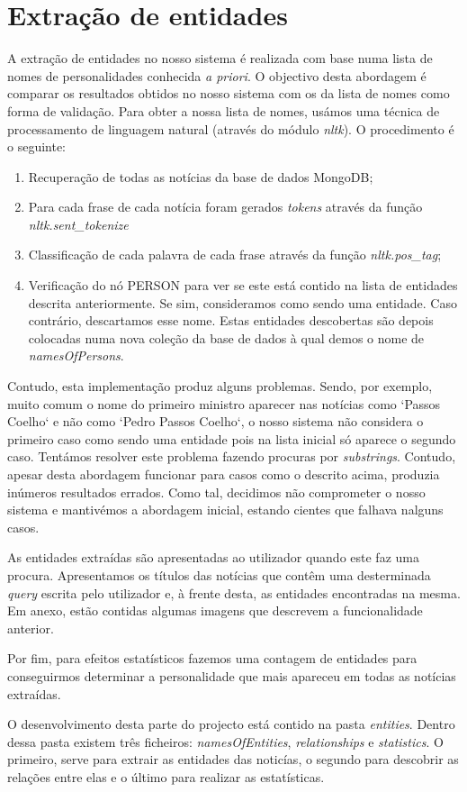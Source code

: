 \section{Extração de entidades}
A extração de entidades no nosso sistema é realizada com base numa lista de nomes de personalidades conhecida \textit{a priori}. O objectivo desta abordagem é comparar os resultados obtidos no nosso sistema com os da lista de nomes como forma de validação. Para obter a nossa lista de nomes, usámos uma técnica de processamento de linguagem natural (através do módulo \textit{nltk}). O procedimento é o seguinte:


\begin{enumerate}
  \item Recuperação de todas as notícias da base de dados MongoDB;
  \item Para cada frase de cada notícia foram gerados \textit{tokens} através da função \textit{nltk.sent\_tokenize}
  \item Classificação de cada palavra de cada frase através da função \textit{nltk.pos\_tag};
  \item Verificação do nó PERSON para ver se este está contido na lista de entidades descrita anteriormente. Se sim, consideramos como sendo uma entidade. Caso contrário, descartamos esse nome. Estas entidades descobertas são depois colocadas numa nova coleção da base de dados à qual demos o nome de \textit{namesOfPersons}. 
\end{enumerate}

Contudo, esta implementação produz alguns problemas. Sendo, por exemplo, muito comum o nome do primeiro ministro aparecer nas notícias como `Passos Coelho` e não como `Pedro Passos Coelho`, o nosso sistema não considera o primeiro caso como sendo uma entidade pois na lista inicial só aparece o segundo caso. Tentámos resolver este problema fazendo procuras por \textit{substrings}. Contudo, apesar desta abordagem funcionar para casos como o descrito acima, produzia inúmeros resultados errados. Como tal, decidimos não comprometer o nosso sistema e mantivémos a abordagem inicial, estando cientes que falhava nalguns casos.

As entidades extraídas são apresentadas ao utilizador quando este faz uma procura. Apresentamos os títulos das notícias que contêm uma desterminada \textit{query} escrita pelo utilizador e, à frente desta, as entidades encontradas na mesma. Em anexo, estão contidas algumas imagens que descrevem a funcionalidade anterior.

Por fim, para efeitos estatísticos fazemos uma contagem de entidades para conseguirmos determinar a personalidade que mais apareceu em todas as notícias extraídas.

O desenvolvimento desta parte do projecto está contido na pasta \textit{entities}. Dentro dessa pasta existem três ficheiros: \textit{namesOfEntities}, \textit{relationships} e \textit{statistics}. O primeiro, serve para extrair as entidades das noticías, o segundo para descobrir as relações entre elas e o último para realizar as estatísticas.



